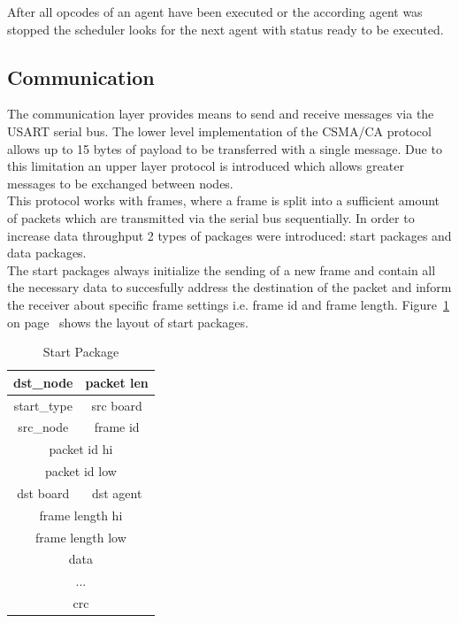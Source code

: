 \documentclass{scrreprt}
\begin{document}
\noindent
After all opcodes of an agent have been executed or the according agent was stopped the scheduler looks for the next agent with status ready
to be executed. 

\subsection{Communication}
The communication layer provides means to send and receive messages via the USART serial bus. The lower level implementation of
the CSMA/CA protocol allows up to 15 bytes of payload to be transferred with a single message. Due to this limitation an upper layer
protocol is introduced which allows greater messages to be exchanged between nodes. \\

\noindent
This protocol works with frames, where a frame is split into a sufficient amount of packets which are transmitted via the serial bus 
sequentially. In order to increase data throughput 2 types of packages were introduced: start packages and data packages.\\

\noindent
The start packages always initialize the sending of a new frame and contain all the necessary data to succesfully address 
the destination of the packet and inform the receiver about specific frame settings i.e. frame id and frame length. 
Figure~\ref{fig:start} on page~\pageref{fig:start} shows the layout of start packages.\\

\begin{table}
\centering
\begin{tabular}{| c | c |}
  \hline
  dst_node &packet len \\ \hline
  start_type & 	src board \\ \hline
  src_node	&	frame id \\ \hline
  \multicolumn{2}{|c|}{packet id hi} \\ \hline
  \multicolumn{2}{|c|}{packet id low} \\ \hline
  dst board	&	dst agent \\ \hline
  \multicolumn{2}{|c|}{frame length hi} \\ \hline
  \multicolumn{2}{|c|}{frame length low} \\ \hline
  \multicolumn{2}{|c|}{data} \\ \hline
  \multicolumn{2}{|c|}{...} \\ \hline
  \multicolumn{2}{|c|}{crc} \\ \hline
  
\end{tabular}
\label{fig:start}
\caption{Start Package}
\end{table}
\end{document}
